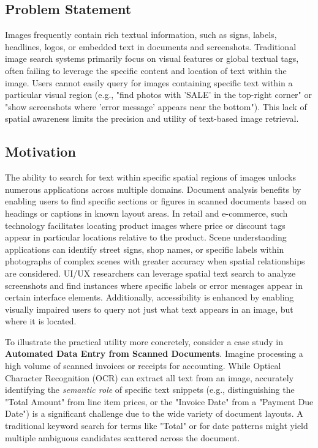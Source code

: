 \documentclass[manuscript,screen]{acmart}
\begin{document}
\subsection{Problem Statement}

Images frequently contain rich textual information, such as signs, labels, headlines, logos, or embedded text in documents and screenshots. Traditional image search systems primarily focus on visual features or global textual tags, often failing to leverage the specific content and location of text within the image. Users cannot easily query for images containing specific text within a particular visual region (e.g., "find photos with 'SALE' in the top-right corner" or "show screenshots where 'error message' appears near the bottom"). This lack of spatial awareness limits the precision and utility of text-based image retrieval.

\subsection{Motivation}

The ability to search for text within specific spatial regions of images unlocks numerous applications across multiple domains. Document analysis benefits by enabling users to find specific sections or figures in scanned documents based on headings or captions in known layout areas. In retail and e-commerce, such technology facilitates locating product images where price or discount tags appear in particular locations relative to the product. Scene understanding applications can identify street signs, shop names, or specific labels within photographs of complex scenes with greater accuracy when spatial relationships are considered. UI/UX researchers can leverage spatial text search to analyze screenshots and find instances where specific labels or error messages appear in certain interface elements. Additionally, accessibility is enhanced by enabling visually impaired users to query not just what text appears in an image, but where it is located.

To illustrate the practical utility more concretely, consider a case study in \textbf{Automated Data Entry from Scanned Documents}. Imagine processing a high volume of scanned invoices or receipts for accounting. While Optical Character Recognition (OCR) can extract all text from an image, accurately identifying the \textit{semantic role} of specific text snippets (e.g., distinguishing the "Total Amount" from line item prices, or the "Invoice Date" from a "Payment Due Date") is a significant challenge due to the wide variety of document layouts. A traditional keyword search for terms like "Total" or for date patterns might yield multiple ambiguous candidates scattered across the document.
\end{document}
